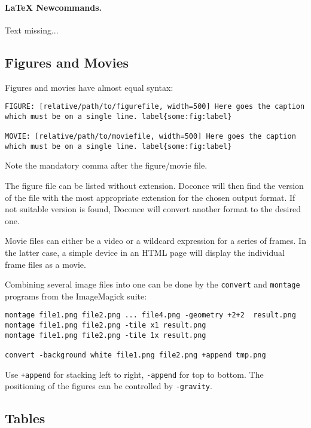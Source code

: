 \documentclass[%
oneside,                 %
final,                   %
10pt]{article}
\begin{document}
\paragraph{LaTeX Newcommands.}
Text missing...

\subsection{Figures and Movies}

Figures and movies have almost equal syntax:
\begin{Verbatim}[numbers=none,fontsize=\fontsize{9pt}{9pt},baselinestretch=0.85,xleftmargin=0mm]
FIGURE: [relative/path/to/figurefile, width=500] Here goes the caption which must be on a single line. label{some:fig:label}

MOVIE: [relative/path/to/moviefile, width=500] Here goes the caption which must be on a single line. label{some:fig:label}

\end{Verbatim}
Note the mandatory comma after the figure/movie file.

The figure file can be listed without extension. Doconce will then find
the version of the file with the most appropriate extension for the chosen
output format. If not suitable version is found, Doconce will convert
another format to the desired one.

Movie files can either be a video or a wildcard expression for a
series of frames. In the latter case, a simple device in an HTML page
will display the individual frame files as a movie.

Combining several image files into one can be done by the
\Verb!convert! and \Verb!montage! programs from the ImageMagick suite:
\begin{Verbatim}[numbers=none,fontsize=\fontsize{9pt}{9pt},baselinestretch=0.85,xleftmargin=0mm]
montage file1.png file2.png ... file4.png -geometry +2+2  result.png
montage file1.png file2.png -tile x1 result.png
montage file1.png file2.png -tile 1x result.png

convert -background white file1.png file2.png +append tmp.png
\end{Verbatim}
Use \Verb!+append! for stacking left to right, \Verb!-append! for top to bottom.
The positioning of the figures can be controlled by \Verb!-gravity!.

\subsection{Tables}
\end{document}
